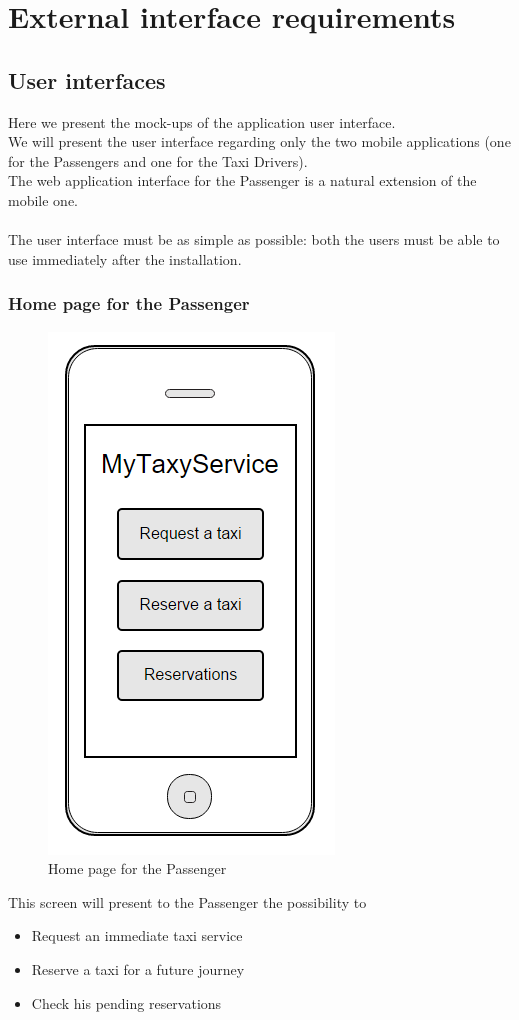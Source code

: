\pagebreak
\section{External interface requirements}
\subsection{User interfaces}
Here we present the mock-ups of the application user interface.\\
We will present the user interface regarding only the two mobile applications (one for the Passengers and one for the Taxi Drivers).\\
The web application interface for the Passenger is a natural extension of the mobile one.
\\
\\
The user interface must be as simple as possible: both the users must be able to use immediately after the installation.
\subsubsection{Home page for the Passenger}
\begin{figure}[H]
\centering
\includegraphics[scale=0.6]{Images/home_page}
\caption{Home page for the Passenger}
\end{figure}
This screen will present to the Passenger the possibility to 
\begin{itemize}
\item Request an immediate taxi service
\item Reserve a taxi for a future journey
\item Check his pending reservations
\end{itemize}

